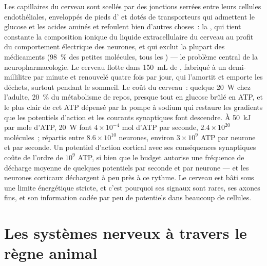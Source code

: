\begin{proposition}\label{prop:b3:nervous-systems:barrier-budget}
Les capillaires du cerveau sont scellés par des jonctions serrées entre
leurs cellules endothéliales, enveloppés de pieds d' et dotés
de transporteurs qui admettent le glucose et les acides aminés et
refoulent bien d'autres choses~: la \emph{},
qui tient constante la composition ionique du liquide extracellulaire du
cerveau au profit du comportement électrique des neurones, et qui exclut
la plupart des médicaments (\qty{98}{\%} des petites molécules, tous les
) --- le problème central de la neuropharmacologie. Le cerveau
flotte dans \qty{150}{mL} de \emph{}, fabriqué à
un demi-millilitre par minute et renouvelé quatre fois par jour, qui
l'amortit et emporte les déchets, surtout pendant le sommeil. Le coût du
cerveau~: quelque \qty{20}{W} chez l'adulte, \qty{20}{\%} du métabolisme
de repos, presque tout en glucose brûlé en ATP, et le plus clair de cet
ATP dépensé par la pompe à sodium qui restaure les gradients que les
potentiels d'action et les courants synaptiques font descendre. À
\qty{50}{kJ} par mole d'ATP, \qty{20}{W} font $4\times 10^{-4}$ mol
d'ATP par seconde, $2.4\times 10^{20}$ molécules~; répartis entre
$8.6\times 10^{10}$ neurones, environ $3\times 10^{9}$ ATP par neurone
et par seconde. Un potentiel d'action cortical avec ses conséquences
synaptiques coûte de l'ordre de $10^{9}$ ATP, si bien que le budget
autorise une fréquence de décharge moyenne de quelques potentiels par
seconde et par neurone --- et les neurones corticaux déchargent à peu
près à ce rythme. Le cerveau est bâti sous une limite énergétique
stricte, et c'est pourquoi ses signaux sont rares, ses axones fins, et
son information codée par peu de potentiels dans beaucoup de cellules.
\end{proposition}
\admitted

\section{Les systèmes nerveux à travers le règne animal}

